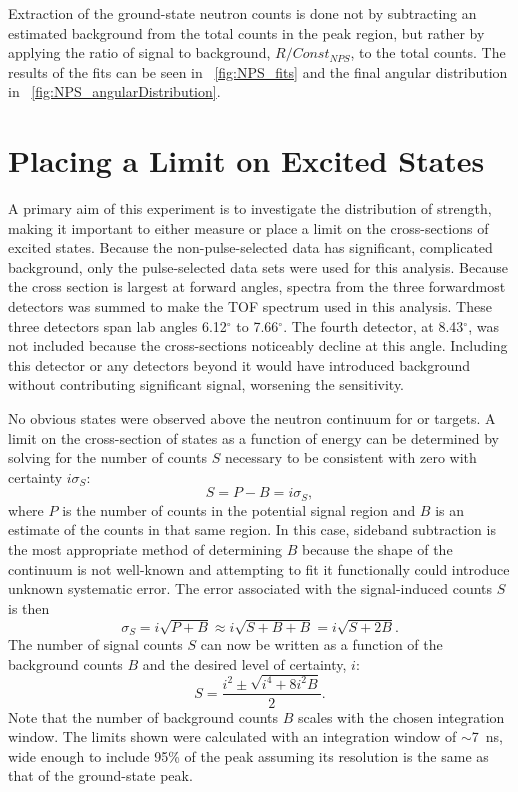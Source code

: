 Extraction of the ground-state neutron counts is done not by subtracting an estimated background from the total counts in the peak region, but rather by applying the ratio of signal to background, $R/Const_{NPS}$, to the total counts.  The results of the fits can be seen in {\fig}~\ref{fig:NPS_fits} and the final angular distribution in {\fig}~\ref{fig:NPS_angularDistribution}.


\section{Placing a Limit on Excited \zp States}

A primary aim of this experiment is to investigate the distribution of \zp strength, making it important to either measure or place a limit on the cross-sections of excited \zp states.  Because the non-pulse-selected data has significant, complicated background, only the pulse-selected data sets were used for this analysis.  Because the \zp cross section is largest at forward angles, spectra from the three forwardmost detectors was summed to make the TOF spectrum used in this analysis.  These three detectors span lab angles 6.12$^{\circ}$ to 7.66$^{\circ}$.  The fourth detector, at 8.43$^{\circ}$, was not included because the \zp cross-sections noticeably decline at this angle.  Including this detector or any detectors beyond it would have introduced background without contributing significant signal, worsening the sensitivity.    

No obvious \zp states were observed above the neutron continuum for  or  targets.  A limit on the cross-section of \zp states as a function of energy can be determined by solving for the number of counts $S$ necessary to be consistent with zero with certainty $i\sigma_S$:
\begin{equation}
S = P - B = i\sigma_S,
\end{equation}
where $P$ is the number of counts in the potential signal region and $B$ is an estimate of the counts in that same region.  In this case, sideband subtraction is the most appropriate method of determining $B$ because the shape of the continuum is not well-known and attempting to fit it functionally could introduce unknown systematic error.  The error associated with the signal-induced counts $S$ is then
\begin{equation}
\sigma_S = i\sqrt{P+B} \approx i\sqrt{S+B+B} = i\sqrt{S+2B}.
\end{equation}
The number of signal counts $S$ can now be written as a function of the background counts $B$ and the desired level of certainty, $i$:
\begin{equation}
S = \frac{i^2 \pm \sqrt{i^4 + 8i^2B}}{2}.
\end{equation}
Note that the number of background counts $B$ scales with the chosen integration window.  The limits shown were calculated with an integration window of $\sim$7~ns, wide enough to include 95\% of the peak assuming its resolution is the same as that of the ground-state peak.

